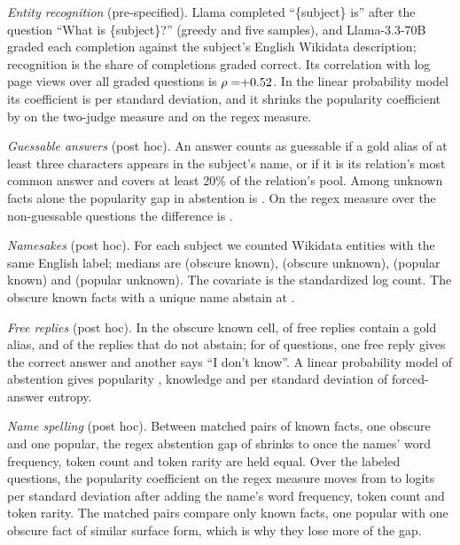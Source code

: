 \documentclass{article}
\newcommand{\idk}{``I don't know''}
\begin{document}
\emph{Entity recognition} (pre-specified). Llama completed ``\{subject\} is'' after the question ``What is \{subject\}?'' (greedy and five samples), and Llama-3.3-70B graded each completion against the subject's English Wikidata description; recognition is the share of completions graded correct. Its correlation with log page views over all graded questions is $\rho=\ekRho$. In the linear probability model its coefficient is \ekCoef{} \ekCoefCI{} per standard deviation, and it shrinks the popularity coefficient by \ekShrink{} on the two-judge measure and \ekShrinkRegex{} on the regex measure.

\emph{Guessable answers} (post hoc). An answer counts as guessable if a gold alias of at least three characters appears in the subject's name, or if it is its relation's most common answer and covers at least 20\% of the relation's pool. Among unknown facts alone the popularity gap in abstention is \hmLlamaPopUnkOnly{} \hmLlamaPopUnkOnlyCI. On the regex measure over the \gsRegexN{} non-guessable questions the difference is \gsRegexDiff{} \gsRegexDiffCI.

\emph{Namesakes} (post hoc). For each subject we counted Wikidata entities with the same English label; medians are \amObsKnownHom{} (obscure known), \amObsUnkHom{} (obscure unknown), \amPopKnownHom{} (popular known) and \amPopUnkHom{} (popular unknown). The covariate is the standardized log count. The \amSingleN{} obscure known facts with a unique name abstain at \amSingle.

\emph{Free replies} (post hoc). In the obscure known cell, \rcObsKnownCorrect{} of free replies contain a gold alias, and \rcObsKnownNonAbsCorrect{} of the replies that do not abstain; for \rcBothN{} of \rcBothOf{} questions, one free reply gives the correct answer and another says \idk. A linear probability model of abstention gives popularity \rcPopEnt{} \rcPopEntCI, knowledge \rcKnowEnt{} \rcKnowEntCI{} and \rcEntCoef{} per standard deviation of forced-answer entropy.

\emph{Name spelling} (post hoc). Between \scPopKnownPairs{} matched pairs of known facts, one obscure and one popular, the regex abstention gap of \scPopKnownGap{} shrinks to \scPopKnownGapSurface{} \scPopKnownGapSurfaceCI{} once the names' word frequency, token count and token rarity are held equal. Over the \faLlamaN{} labeled questions, the popularity coefficient on the regex measure moves from \scPoolPop{} to \scPoolPopSurface{} logits per standard deviation after adding the name's word frequency, token count and token rarity. The matched pairs compare only known facts, one popular with one obscure fact of similar surface form, which is why they lose more of the gap.
\end{document}
